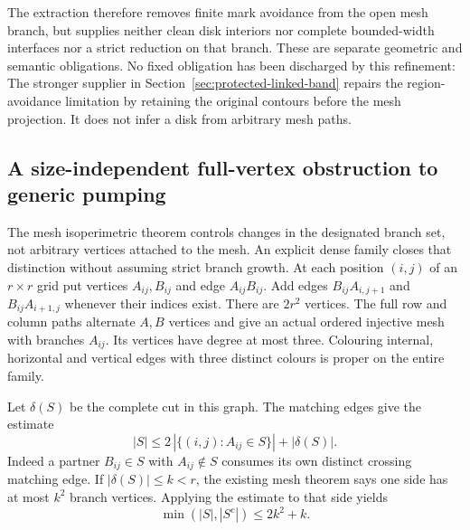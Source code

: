 The extraction therefore removes finite mark avoidance from the open
mesh branch, but supplies neither clean disk interiors nor complete
bounded-width interfaces nor a strict reduction on that branch.
These are separate geometric and semantic obligations. No fixed
obligation has been discharged by this refinement: The stronger supplier in Section~\ref{sec:protected-linked-band} repairs
the region-avoidance limitation by retaining the original contours before
the mesh projection. It does not infer a disk from arbitrary mesh paths.

\subsection{A size-independent full-vertex obstruction to generic pumping}
\label{sec:split-grid-chain-obstruction}

The mesh isoperimetric theorem controls changes in the designated branch
set, not arbitrary vertices attached to the mesh. An explicit dense family
closes that distinction without assuming strict branch growth. At each
position $(i,j)$ of an $r\times r$ grid put vertices $A_{ij},B_{ij}$ and
edge $A_{ij}B_{ij}$. Add edges $B_{ij}A_{i,j+1}$ and
$B_{ij}A_{i+1,j}$ whenever their indices exist. There are $2r^2$ vertices.
The full row and column paths alternate $A,B$ vertices and give an actual
ordered injective mesh with branches $A_{ij}$. Its vertices have degree at
most three. Colouring internal, horizontal and vertical edges with three
distinct colours is proper on the entire family.

Let $\delta(S)$ be the complete cut in this graph. The matching edges
give the estimate
\[
 |S|\leq 2\,|\{(i,j):A_{ij}\in S\}|+|\delta(S)|.
\]
Indeed a partner $B_{ij}\in S$ with $A_{ij}\notin S$ consumes its own
distinct crossing matching edge. If $|\delta(S)|\leq k<r$, the existing
mesh theorem says one side has at most $k^2$ branch vertices. Applying
the estimate to that side yields
\[
 \min(|S|,|S^c|)\leq 2k^2+k.
\]

